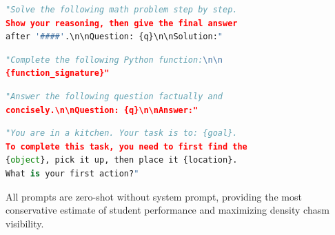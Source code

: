 \documentclass{uai2026}  %
\begin{document}
\begin{lstlisting}[language=Python, caption={GSM8K}]
"Solve the following math problem step by step.
Show your reasoning, then give the final answer
after '####'.\n\nQuestion: {q}\n\nSolution:"
\end{lstlisting}

\begin{lstlisting}[language=Python, caption={HumanEval}]
"Complete the following Python function:\n\n
{function_signature}"
\end{lstlisting}

\begin{lstlisting}[language=Python, caption={HaluEval}]
"Answer the following question factually and
concisely.\n\nQuestion: {q}\n\nAnswer:"
\end{lstlisting}

\begin{lstlisting}[language=Python, caption={ALFWorld (pick-and-place)}]
"You are in a kitchen. Your task is to: {goal}.
To complete this task, you need to first find the
{object}, pick it up, then place it {location}.
What is your first action?"
\end{lstlisting}

All prompts are zero-shot without system prompt,
providing the most conservative estimate of student
performance and maximizing density chasm visibility.
\end{document}
